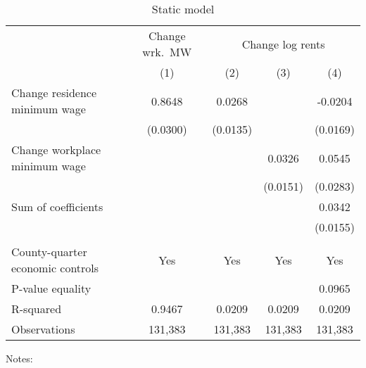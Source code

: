\begin{table}[hbt!] \centering
    \caption{Static model}
    \label{tab:static}
    \begin{tabular}{l*{4}{c}}
        \toprule
        & \multicolumn{1}{c}{Change wrk.\ MW}
            & \multicolumn{3}{c}{Change log rents}                            \\ \cmidrule(lr){2-2}\cmidrule(lr){3-5}
                                           & (1)   & (2)   & (3)   & (4)      \\ \midrule
        Change residence minimum wage      &  0.8648  &  0.0268  &       &  -0.0204     \\
                                           & (0.0300) & (0.0135) &       & (0.0169)    \\
        Change workplace minimum wage      &       &       &  0.0326  & 0.0545      \\
                                           &       &       & (0.0151) & (0.0283)    \\ \midrule
        Sum of coefficients                &       &       &       &  0.0342     \\
                                           &       &       &       & (0.0155)    \\
                                           &       &       &       &          \\ \midrule
        County-quarter economic controls   &  Yes  & Yes   & Yes   & Yes      \\
        P-value equality                   &       &       &       & 0.0965      \\
        R-squared                          &  0.9467  &  0.0209  &  0.0209  & 0.0209      \\
        Observations                       & 131,383  & 131,383  & 131,383  & 131,383     \\\bottomrule
    \end{tabular}

    \begin{minipage}{.95\textwidth} \footnotesize
        \vspace{2mm}
        Notes: 
    \end{minipage}
\end{table}

